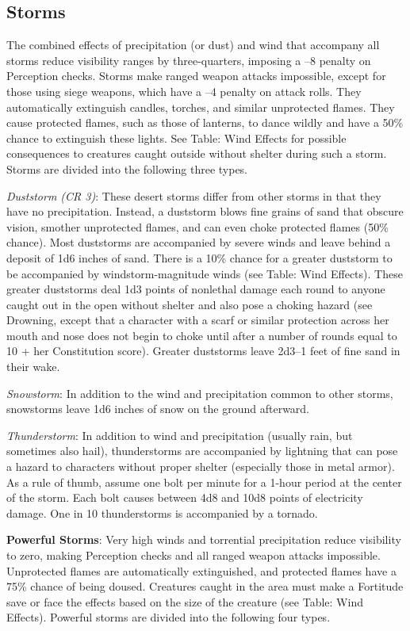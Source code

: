 \subsection{Storms}

				
The combined effects of precipitation (or dust) and wind that accompany all storms reduce visibility ranges by three-quarters, imposing a --8 penalty on Perception checks. Storms make ranged weapon attacks impossible, except for those using siege weapons, which have a --4 penalty on attack rolls. They automatically extinguish candles, torches, and similar unprotected flames. They cause protected flames, such as those of lanterns, to dance wildly and have a 50\% chance to extinguish these lights. See Table: Wind Effects for possible consequences to creatures caught outside without shelter during such a storm. Storms are divided into the following three types. 
				
\textit{Duststorm (CR 3)}: These desert storms differ from other storms in that they have no precipitation. Instead, a duststorm blows fine grains of sand that obscure vision, smother unprotected flames, and can even choke protected flames (50\% chance). Most duststorms are accompanied by severe winds and leave behind a deposit of 1d6 inches of sand. There is a 10\% chance for a greater duststorm to be accompanied by windstorm-magnitude winds (see Table: Wind Effects). These greater duststorms deal 1d3 points of nonlethal damage each round to anyone caught out in the open without shelter and also pose a choking hazard (see Drowning, except that a character with a scarf or similar protection across her mouth and nose does not begin to choke until after a number of rounds equal to 10 + her Constitution score). Greater duststorms leave 2d3--1 feet of fine sand in their wake.
				
\textit{Snowstorm}: In addition to the wind and precipitation common to other storms, snowstorms leave 1d6 inches of snow on the ground afterward. 
				
\textit{Thunderstorm}: In addition to wind and precipitation (usually rain, but sometimes also hail), thunderstorms are accompanied by lightning that can pose a hazard to characters without proper shelter (especially those in metal armor). As a rule of thumb, assume one bolt per minute for a 1-hour period at the center of the storm. Each bolt causes between 4d8 and 10d8 points of electricity damage. One in 10 thunderstorms is accompanied by a tornado. 
				
\textbf{Powerful Storms}: Very high winds and torrential precipitation reduce visibility to zero, making Perception checks and all ranged weapon attacks impossible. Unprotected flames are automatically extinguished, and protected flames have a 75\% chance of being doused. Creatures caught in the area must make a Fortitude save or face the effects based on the size of the creature (see Table: Wind Effects). Powerful storms are divided into the following four types.
				
